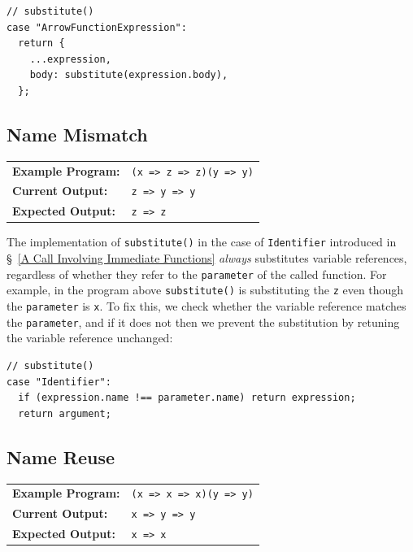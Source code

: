 \documentclass[12pt, oneside]{book}
\begin{document}
\begin{verbatim}
// substitute()
case "ArrowFunctionExpression":
  return {
    ...expression,
    body: substitute(expression.body),
  };
\end{verbatim}

\subsection{Name Mismatch}

\begin{center}
\begin{tabular}{ll}
\textbf{Example Program:} & \texttt{(x => z => z)(y => y)} \\
\textbf{Current Output:} & \texttt{z => y => y} \\
\textbf{Expected Output:} & \texttt{z => z} \\
\end{tabular}
\end{center}

The implementation of \texttt{substitute()} in the case of \texttt{Identifier} introduced in §~\ref{A Call Involving Immediate Functions} \emph{always} substitutes variable references, regardless of whether they refer to the \texttt{parameter} of the called function. For example, in the program above \texttt{substitute()} is substituting the \texttt{z} even though the \texttt{parameter} is \texttt{x}. To fix this, we check whether the variable reference matches the \texttt{parameter}, and if it does not then we prevent the substitution by retuning the variable reference unchanged:

\begin{verbatim}
// substitute()
case "Identifier":
  if (expression.name !== parameter.name) return expression;
  return argument;
\end{verbatim}

\subsection{Name Reuse}
\label{Step 0: Name Reuse}

\begin{center}
\begin{tabular}{ll}
\textbf{Example Program:} & \texttt{(x => x => x)(y => y)} \\
\textbf{Current Output:} & \texttt{x => y => y} \\
\textbf{Expected Output:} & \texttt{x => x} \\
\end{tabular}
\end{center}
\end{document}
